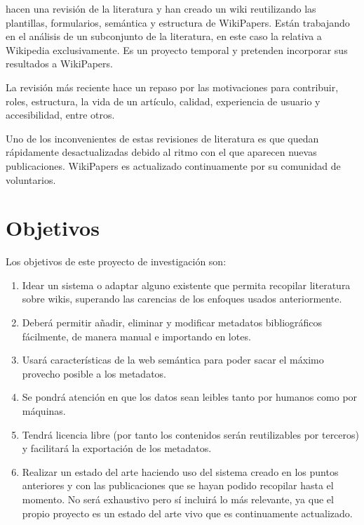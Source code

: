 \documentclass[11pt,onecolumn]{article}
\begin{document}
\cite{okoli2012} hacen una revisión de la literatura y han creado un wiki reutilizando las plantillas, formularios, semántica y estructura de WikiPapers. Están trabajando en el análisis de un subconjunto de la literatura, en este caso la relativa a Wikipedia exclusivamente. Es un proyecto temporal y pretenden incorporar sus resultados a WikiPapers.

La revisión más reciente \cite{jullien2012} hace un repaso por las motivaciones para contribuir, roles, estructura, la vida de un artículo, calidad, experiencia de usuario y accesibilidad, entre otros.

Uno de los inconvenientes de estas revisiones de literatura es que quedan rápidamente desactualizadas debido al ritmo con el que aparecen nuevas publicaciones. WikiPapers es actualizado continuamente por su comunidad de voluntarios.

\clearpage

\section{Objetivos}

Los objetivos de este proyecto de investigación son:

\begin{enumerate}
\item Idear un sistema o adaptar alguno existente que permita recopilar literatura sobre wikis, superando las carencias de los enfoques usados anteriormente.
\item Deberá permitir añadir, eliminar y modificar metadatos bibliográficos fácilmente, de manera manual e importando en lotes.
\item Usará características de la web semántica para poder sacar el máximo provecho posible a los metadatos.
\item Se pondrá atención en que los datos sean leibles tanto por humanos como por máquinas.
\item Tendrá licencia libre (por tanto los contenidos serán reutilizables por terceros) y facilitará la exportación de los metadatos.
\item Realizar un estado del arte haciendo uso del sistema creado en los puntos anteriores y con las publicaciones que se hayan podido recopilar hasta el momento. No será exhaustivo pero sí incluirá lo más relevante, ya que el propio proyecto es un estado del arte vivo que es continuamente actualizado.
\end{enumerate}

\clearpage
\end{document}
